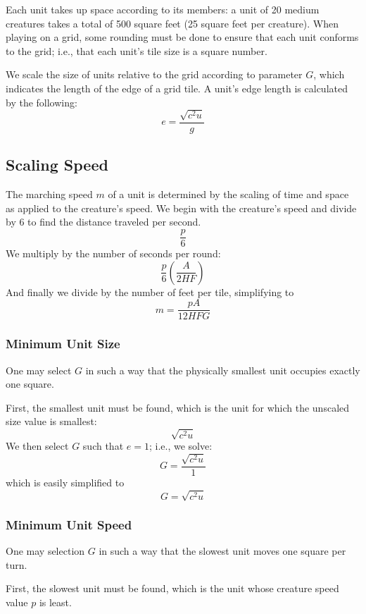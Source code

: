 \documentclass[twocolumn]{article}
\begin{document}
Each unit takes up space according to its members:
a unit of 20 medium creatures takes a total of 500 square feet (25 square feet per creature).
When playing on a grid,
some rounding must be done to ensure that each unit conforms to the grid;
i.e., that each unit's tile size is a square number.

We scale the size of units relative to the grid
according to parameter $G$,
which indicates the length of the edge of a grid tile.
A unit's edge length is calculated by the following:
\[
    e = \frac
        {\sqrt{c^2 u}}
        {g}
\]

\subsection{Scaling Speed}
The marching speed $m$ of a unit is determined
by the scaling of time and space
as applied to the creature's speed.
We begin with the creature's speed and divide by 6
to find the distance traveled per second.
\[
    \frac
        {p}
        {6}
\]
We multiply by the number of seconds per round:
\[
    \frac
        {p}
        {6}
    \left(
        \frac
            {A}
            {2 H F}
    \right)
\]
And finally we divide by the number of feet per tile,
simplifying to
\[
    m = \frac
        {p A}
        {12 H F G}
\]

\subsubsection{Minimum Unit Size}

One may select $G$ in such a way that the physically smallest unit
occupies exactly one square.

First, the smallest unit must be found,
which is the unit for which the unscaled size value is smallest:
\[
    \sqrt{c^2 u}
\]
We then select $G$ such that $e = 1$;
i.e., we solve:
\[
    G = \frac
            {\sqrt{c^2 u}}
            {1}
\]
which is easily simplified to
\[
    G = \sqrt{c^2 u}
\]

\subsubsection{Minimum Unit Speed}

One may selection $G$ in such a way that the slowest unit moves one square per turn.

First, the slowest unit must be found,
which is the unit whose creature speed value $p$ is least.
\end{document}
